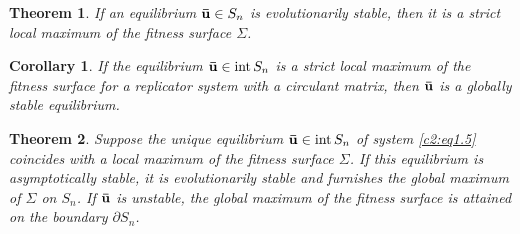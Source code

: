 \documentclass[10pt,a4paper]{amsart}
\newtheorem{theorem}{Theorem}
\newtheorem{conseq}{Corollary}
\newcommand{\bound}{\partial}
\newcommand{\inside}{\mathrm{int}\,}
\begin{document}
\begin{theorem}\label{c2:t2.3}
	If an equilibrium ${\bf \bar{u}} \in S_{n}$ is evolutionarily stable, then it is a strict local maximum of the fitness surface $\Sigma$.
\end{theorem}

\begin{conseq}\label{c2:con2.1}
	If the equilibrium ${\bf \bar{u}} \in \inside S_{n}$ is a strict local maximum of the fitness surface for a replicator system with a circulant matrix, then ${\bf \bar{u}}$ is a globally stable equilibrium.
\end{conseq}

\begin{theorem}\label{c2:t2.5}
	Suppose the unique equilibrium ${\bf \bar{u}} \in \inside S_{n}$ of system \eqref{c2:eq1.5} coincides with a local maximum of the fitness surface $\Sigma$. If this equilibrium is asymptotically stable, it is evolutionarily stable and furnishes the global maximum of $\Sigma$ on $S_{n}$. If ${\bf \bar{u}}$ is unstable, the global maximum of the fitness surface is attained on the boundary $\bound S_{n}$.
\end{theorem}
\end{document}
